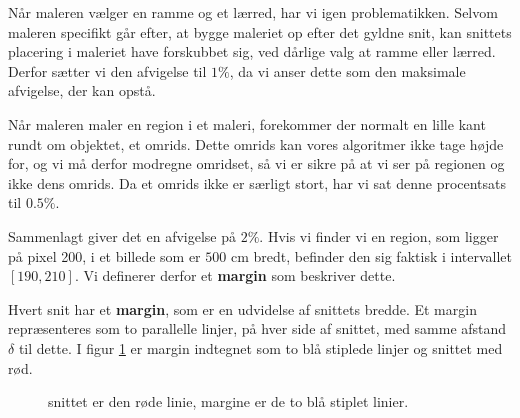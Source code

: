 {Når maleren vælger en ramme og et lærred, har vi igen problematikken.
Selvom maleren specifikt går efter, at bygge maleriet op efter det gyldne
snit, kan snittets placering i maleriet have forskubbet sig, ved dårlige
valg at ramme eller lærred. Derfor sætter vi den afvigelse til $1\%$, da
vi anser dette som den maksimale afvigelse, der kan opstå.

Når maleren maler en region i et maleri, forekommer der normalt en
lille kant rundt om objektet, et omrids. Dette omrids kan vores
algoritmer ikke tage højde for, og vi må derfor modregne omridset, så vi
er sikre på at vi ser på regionen og ikke dens omrids. Da et omrids ikke
er særligt stort, har vi sat denne procentsats til $0.5\%$.

Sammenlagt giver det en afvigelse på $2\%$. Hvis vi finder vi en region,
som ligger på pixel 200, i et billede som er $500$ cm bredt, befinder
den sig faktisk i intervallet $[190,210]$. Vi definerer derfor et
\textbf{margin} som beskriver dette.

\begin{definition}
    Hvert snit har et \textbf{margin}, som er en udvidelse af snittets
    bredde. Et margin repræsenteres som to parallelle linjer, på hver
    side af snittet, med samme afstand $\delta$ til dette.  I figur
    \ref{margin} er margin indtegnet som to blå stiplede linjer og
    snittet med rød.
\end{definition}

\begin{figure}[hb]
    \setlength\fboxsep{0pt}
    \setlength\fboxrule{0.5pt}
    \centering
    \caption[]{snittet er den røde linie, margine er de to blå stiplet linier.}
    \label{margin}
\end{figure}

}
